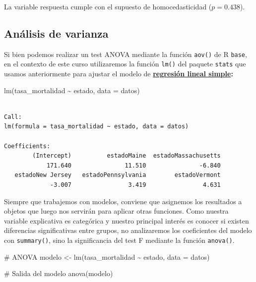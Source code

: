 \documentclass[
  spanish,
  a4paper,
]{scrbook}
\newenvironment{Shaded}{\begin{snugshade}}{\end{snugshade}}
\newcommand{\AttributeTok}[1]{\textcolor[rgb]{0.40,0.45,0.13}{#1}}
\newcommand{\CommentTok}[1]{\textcolor[rgb]{0.37,0.37,0.37}{#1}}
\newcommand{\FunctionTok}[1]{\textcolor[rgb]{0.28,0.35,0.67}{#1}}
\newcommand{\NormalTok}[1]{\textcolor[rgb]{0.00,0.23,0.31}{#1}}
\newcommand{\OtherTok}[1]{\textcolor[rgb]{0.00,0.23,0.31}{#1}}
\newcommand{\SpecialCharTok}[1]{\textcolor[rgb]{0.37,0.37,0.37}{#1}}
\begin{document}
La variable respuesta cumple con el supuesto de homocedasticidad
(\(p = 0.438\)).

\subsection{Análisis de varianza}\label{anuxe1lisis-de-varianza}

Si bien podemos realizar un test ANOVA mediante la función
\texttt{aov()} de R \texttt{base}, en el contexto de este curso
utilizaremos la función \texttt{lm()} del paquete \texttt{stats} que
usamos anteriormente para ajustar el modelo de
\hyperref[regresiuxf3n-lineal-simple]{\textbf{regresión lineal
simple}}\textbf{:}

\begin{Shaded}
\begin{Highlighting}[]
\FunctionTok{lm}\NormalTok{(tasa\_mortalidad }\SpecialCharTok{\textasciitilde{}}\NormalTok{ estado, }\AttributeTok{data =}\NormalTok{ datos)}
\end{Highlighting}
\end{Shaded}

\begin{verbatim}

Call:
lm(formula = tasa_mortalidad ~ estado, data = datos)

Coefficients:
        (Intercept)          estadoMaine  estadoMassachusetts  
            171.640               11.510               -6.840  
   estadoNew Jersey   estadoPennsylvania        estadoVermont  
             -3.007                3.419                4.631  
\end{verbatim}

Siempre que trabajemos con modelos, conviene que asignemos los
resultados a objetos que luego nos servirán para aplicar otras
funciones. Como nuestra variable explicativa es categórica y nuestro
principal interés es conocer si existen diferencias significativas entre
grupos, no analizaremos los coeficientes del modelo con
\texttt{summary()}, sino la significancia del test F mediante la función
\texttt{anova()}.

\begin{Shaded}
\begin{Highlighting}[]
\CommentTok{\# ANOVA}
\NormalTok{modelo }\OtherTok{\textless{}{-}} \FunctionTok{lm}\NormalTok{(tasa\_mortalidad }\SpecialCharTok{\textasciitilde{}}\NormalTok{ estado, }\AttributeTok{data =}\NormalTok{ datos)}

\CommentTok{\# Salida del modelo}
\FunctionTok{anova}\NormalTok{(modelo)}
\end{Highlighting}
\end{Shaded}
\end{document}

